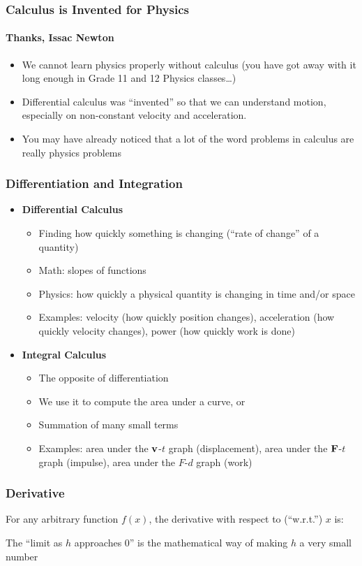 \documentclass[12pt,compress,aspectratio=169]{beamer}
\newcommand{\mb}[1]{\ensuremath\mathbf{#1}}
\newcommand{\eq}[2]{\vspace{#1}{\Large\begin{displaymath}#2\end{displaymath}}}
\begin{document}
\begin{frame}
  \frametitle{Calculus is Invented for Physics}
  \framesubtitle{Thanks, Issac Newton}
  \begin{itemize}
  \item We cannot learn physics properly without calculus (you have got away
    with it long enough in Grade 11 and 12 Physics classes\ldots)
  \item Differential calculus was ``invented'' so that we can understand
    motion, especially on non-constant velocity and acceleration.
  \item You may have already noticed that a lot of the word problems in
    calculus are really physics problems
  \end{itemize}
\end{frame}

\begin{frame}
  \frametitle{Differentiation and Integration}
  \begin{itemize}
  \item\textbf{Differential Calculus}
    \begin{itemize}
    \item Finding how quickly something is changing (``rate of change'' of a
      quantity)
    \item Math: slopes of functions
    \item Physics: how quickly a physical quantity is changing in time and/or
      space
    \item Examples: velocity (how quickly position changes), acceleration
      (how quickly velocity changes), power (how quickly work is done)
    \end{itemize}
  \item\textbf{Integral Calculus}
    \begin{itemize}
    \item The opposite of differentiation
    \item We use it to compute the area under a curve, or
    \item Summation of many small terms
    \item Examples: area under the $\mb{v}$-$t$ graph (displacement), area
      under the $\mb{F}$-$t$ graph (impulse), area under the $F$-$d$ graph
      (work)
    \end{itemize}
  \end{itemize}
\end{frame}


\begin{frame}
  \frametitle{Derivative}
  For any arbitrary function $f(x)$, the derivative with respect to
  (``w.r.t.'') $x$ is:

  \eq{-.2in}{
    \boxed{f'(x)=\lim_{h\rightarrow 0}\frac{f(x+h)-f(x)}{h}}
  }

  The ``limit as $h$ approaches $0$'' is the mathematical way of making $h$
  a very small number
\end{frame}
\end{document}
